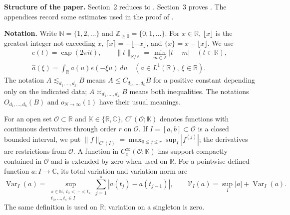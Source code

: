 \documentclass[reqno,12pt]{amsart}
\def \N {\mathbb N}
\def \C {\mathbb C}
\def \Z {\mathbb Z}
\def \R {\mathbb R}
\def \t {\mathcal{T}}
\numberwithin{equation}{section}
\begin{document}
%

\medskip
 \noindent\textbf{Structure of the paper.}
Section~2 reduces  to . Section~3 proves
.
The appendices record some estimates used in the proof of .

\medskip
\noindent\textbf{Notation.}\label{sec1:notation}
Write $\N=\{1,2,\ldots\}$ and
$\Z_{\ge0}=\{0,1,\ldots\}$. For $x\in\R$, $\lfloor x\rfloor$
is the greatest integer not exceeding $x$,
$\lceil x\rceil=-\lfloor-x\rfloor$, and
$\{x\}=x-\lfloor x\rfloor$. We use
\[
 \begin{gathered}
 e(t)=\exp(2\pi it),\qquad
 \|t\|_{\R/\Z}=\min_{m\in\Z}|t-m|\quad(t\in\R),\\
 \widehat a(\xi)=\int_\R a(u)e(-\xi u)\,du\quad(a\in L^1(\R),\ \xi\in\R).
 \end{gathered}
\]
The notation $A\lesssim_{d_1,\ldots,d_k}B$ means
$A\le C_{d_1,\ldots,d_k}B$ for a positive constant depending only on
the indicated data; $A\asymp_{d_1,\ldots,d_k}B$ means both inequalities.
The notations $O_{d_1,\ldots,d_k}(B)$ and $o_{N\to\infty}(1)$ have their
usual meanings.

For an open set $\mathcal O\subset\R$ and
$\mathbb K\in\{\R,\C\}$, $C^r(\mathcal O;\mathbb K)$ denotes
functions with continuous derivatives through order $r$ on
$\mathcal O$. If $I=[a,b]\subset\mathcal O$ is a closed bounded
interval, we put
$\|f\|_{C^r(I)}=\max_{0\le j\le r}\sup_I|f^{(j)}|$;
the derivatives are restrictions from $\mathcal O$.
A function in $C_c^\infty(\mathcal O;\mathbb K)$ has support compactly
contained in $\mathcal O$ and is extended by zero when used on $\R$.
For a pointwise-defined function $a:I\to\C$, its total variation and
variation norm are
\[
 \operatorname{Var}_I(a)=
 \sup_{\substack{s\in\N,\ t_0<\cdots<t_s\\t_0,\ldots,t_s\in I}}
       \sum_{j=1}^s|a(t_j)-a(t_{j-1})|,
 \qquad
 \mathcal V_I(a)=\sup_I|a|+\operatorname{Var}_I(a).
\]
The same definition is used on $\R$; variation on a singleton is zero.
\end{document}
